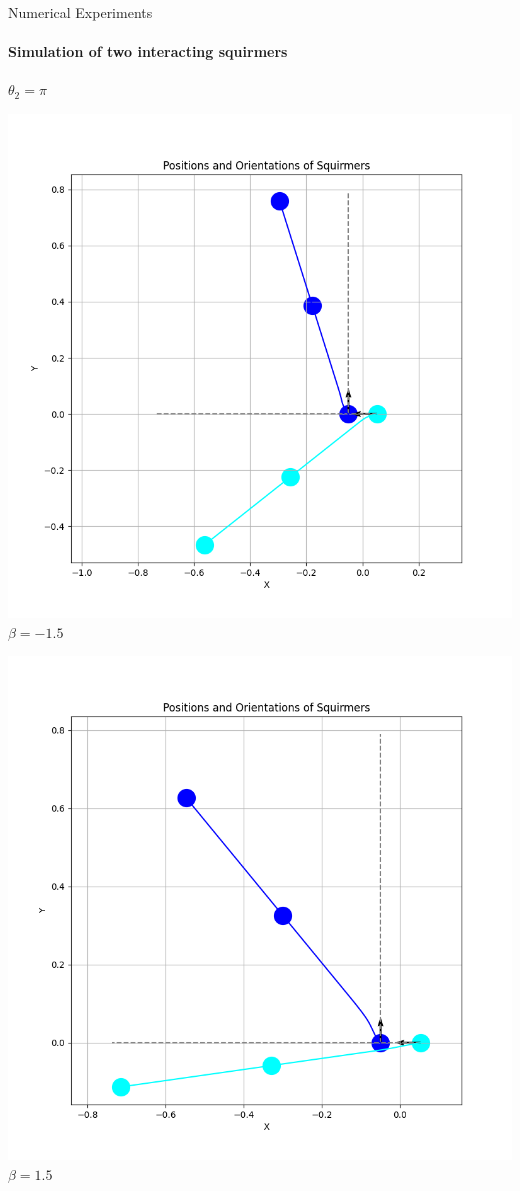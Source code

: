 \documentclass{beamer}
\begin{document}
\begin{frame}{Numerical Experiments}
    \framesubtitle{Simulation of two interacting squirmers}
    \begin{center}
        \textbf{$\theta_2 = \pi$}
    \end{center}
    \begin{minipage}{0.49\textwidth}
        \centering
        \includegraphics[width=1\textwidth]{../../graphs/simulations/sim_sq_sq/betam1_5/pi_.png}
        $\beta = -1.5$
    \end{minipage}
    \begin{minipage}{0.49\textwidth}
        \centering
        \includegraphics[width=1\textwidth]{../../graphs/simulations/sim_sq_sq/beta1_5/pi_.png}
        $\beta = 1.5$
    \end{minipage}
\end{frame}
\end{document}
